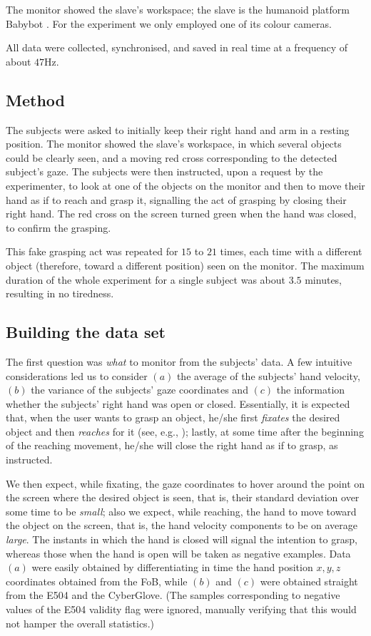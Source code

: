 \documentclass[a4paper,10pt,conference]{ieeeconf}
\begin{document}
The monitor showed the slave's workspace; the slave is the humanoid
platform Babybot \cite{babybotHum2005}. For the experiment we only
employed one of its colour cameras.

All data were collected, synchronised, and saved in real time at a
frequency of about $47$Hz.

\subsection{Method}

The subjects were asked to initially keep their right hand and arm in
a resting position. The monitor showed the slave's workspace, in which
several objects could be clearly seen, and a moving red cross
corresponding to the detected subject's gaze. The subjects were then
instructed, upon a request by the experimenter, to look at one of the
objects on the monitor and then to move their hand as if to reach and
grasp it, signalling the act of grasping by closing their right
hand. The red cross on the screen turned green when the hand was
closed, to confirm the grasping.

This fake grasping act was repeated for $15$ to $21$ times, each time
with a different object (therefore, toward a different position) seen
on the monitor. The maximum duration of the whole experiment for a
single subject was about $3.5$ minutes, resulting in no tiredness.

\subsection{Building the data set}
\label{subsec:dataset}

The first question was \emph{what} to monitor from the subjects'
data. A few intuitive considerations led us to consider $(a)$ the
average of the subjects' hand velocity, $(b)$ the variance of the
subjects' gaze coordinates and $(c)$ the information whether the
subjects' right hand was open or closed. Essentially, it is expected
that, when the user wants to grasp an object, he/she first
\emph{fixates} the desired object and then \emph{reaches} for it (see,
e.g., \cite{johansson01}); lastly, at some time after the beginning of
the reaching movement, he/she will close the right hand as if to
grasp, as instructed.

We then expect, while fixating, the gaze coordinates to hover around
the point on the screen where the desired object is seen, that is,
their standard deviation over some time to be \emph{small}; also we
expect, while reaching, the hand to move toward the object on the
screen, that is, the hand velocity components to be on average
\emph{large}. The instants in which the hand is closed will signal the
intention to grasp, whereas those when the hand is open will be taken
as negative examples. Data $(a)$ were easily obtained by
differentiating in time the hand position $x,y,z$ coordinates obtained
from the FoB, while $(b)$ and $(c)$ were obtained straight from the
E504 and the CyberGlove. (The samples corresponding to negative values
of the E504 validity flag were ignored, manually verifying that this
would not hamper the overall statistics.)
\end{document}
